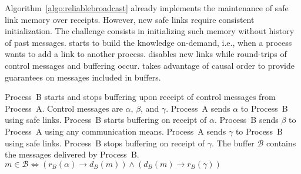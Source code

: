 Algorithm~\ref{algo:reliablebroadcast} already implements the maintenance of
safe link memory over receipts. However, new safe links require consistent
initialization. The challenge consists in initializing such memory without
history of past messages. \RPCBROADCAST starts to build the knowledge on-demand,
i.e., when a process wants to add a link to another process. \RPCBROADCAST
disables new links while round-trips of control messages and buffering occur.
\RPCBROADCAST takes advantage of causal order to provide guarantees on messages
included in buffers.


\begin{definition}
  Process~B starts and stops buffering upon receipt of control messages from
  Process~A. Control messages are $\alpha$, $\beta$, and $\gamma$. Process~A
  sends $\alpha$ to Process~B using safe links. Process~B starts buffering on
  receipt of $\alpha$. Process~B sends $\beta$ to Process~A using any
  communication means. Process~A sends $\gamma$ to Process~B using safe
  links. Process~B stops buffering on receipt of $\gamma$.
  The buffer $\mathcal{B}$ contains the messages delivered by Process~B.
  $m \in \mathcal{B} \Longleftrightarrow 
  (r_B(\alpha) \rightarrow d_B(m)) \wedge (d_B(m) \rightarrow r_B(\gamma))$
\end{definition}



